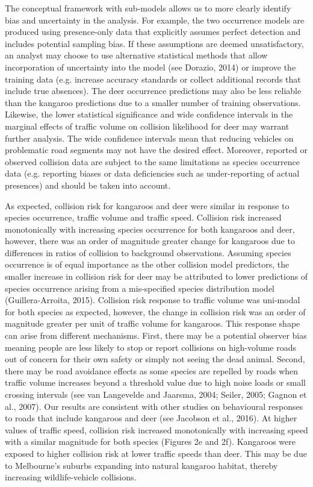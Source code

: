 The conceptual framework with sub-models allows us to more clearly identify bias and uncertainty in the analysis.  For example, the two occurrence models are produced using presence-only data that explicitly assumes perfect detection and includes potential sampling bias.  If these assumptions are deemed unsatisfactory, an analyst may choose to use alternative statistical methods that allow incorporation of uncertainty into the model (see Dorazio, 2014) or improve the training data (e.g. increase accuracy standards or collect additional records that include true absences).  The deer occurrence predictions may also be less reliable than the kangaroo predictions due to a smaller number of training observations.  Likewise, the lower statistical significance and wide confidence intervals in the marginal effects of traffic volume on collision likelihood for deer may warrant further analysis. The wide confidence intervals mean that reducing vehicles on problematic road segments may not have the desired effect.  Moreover, reported or observed collision data are subject to the same limitations as species occurrence data (e.g. reporting biases or data deficiencies such as under-reporting of actual presences) and should be taken into account.

As expected, collision risk for kangaroos and deer were similar in response to species occurrence, traffic volume and traffic speed.  Collision risk increased monotonically with increasing species occurrence for both kangaroos and deer, however, there was an order of magnitude greater change for kangaroos due to differences in ratios of collision to background observations.  Assuming species occurrence is of equal importance as the other collision model predictors, the smaller increase in collision risk for deer may be attributed to lower predictions of species occurrence arising from a mis-specified species distribution model (Guillera-Arroita, 2015).  Collision risk response to traffic volume was uni-modal for both species as expected, however, the change in collision risk was an order of magnitude greater per unit of traffic volume for kangaroos.  This response shape can arise from different mechanisms.  First, there may be a potential observer bias meaning people are less likely to stop or report collisions on high-volume roads out of concern for their own safety or simply not seeing the dead animal.  Second, there may be road avoidance effects as some species are repelled by roads when traffic volume increases beyond a threshold value due to high noise loads or small crossing intervals (see van Langevelde and Jaarsma, 2004; Seiler, 2005; Gagnon et al., 2007).  Our results are consistent with other studies on behavioural responses to roads that include kangaroos and deer (see Jacobson et al., 2016).  At higher values of traffic speed, collision risk increased monotonically with increasing speed with a similar magnitude for both species (Figures 2e and 2f).  Kangaroos were exposed to higher collision risk at lower traffic speeds than deer.  This may be due to Melbourne’s suburbs expanding into natural kangaroo habitat, thereby increasing wildlife-vehicle collisions.

